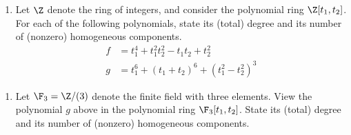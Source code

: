 %
%

\begin{enumerate}[label=(\alph*)]
\item Let $\Z$ denote the ring of integers, and consider the polynomial ring $\Z[t_{1}, t_{2}]$. For each of the following polynomials, state its (total) degree and its number of (nonzero) homogeneous components.
\begin{align*}
f
&=
t_{1}^{4} + t_{1}^{2} t_{2}^{2} - t_{1} t_{2} + t_{2}^{2}
\\
g
&=
t_{1}^{6} + (t_{1} + t_{2})^{6} + (t_{1}^{2} - t_{2}^{2})^{3}
\end{align*}
\end{enumerate}

\spaceSolution{3in}{%
}%



\begin{enumerate}[resume, label=(\alph*)]
\item Let $\F_{3} = \Z / (3)$ denote the finite field with three elements. View the polynomial $g$ above in the polynomial ring $\F_{3}[t_{1}, t_{2}]$. State its (total) degree and its number of (nonzero) homogeneous components. 
\end{enumerate}

\spaceSolution{3in}{%
}%